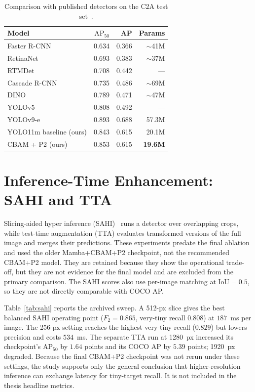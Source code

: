 \begin{table}[tbp]
  \centering
  \caption{Comparison with published detectors on the C2A test set~\cite{nihal2024c2a}.}
  \label{tab:sota}
  \begin{tabular}{@{}l r r r@{}}
    \toprule
    Model & $\mathrm{AP}_{50}$ & AP & Params \\
    \midrule
    Faster R-CNN            & 0.634 & 0.366 & $\sim$41M \\
    RetinaNet               & 0.693 & 0.383 & $\sim$37M \\
    RTMDet                  & 0.708 & 0.442 & --- \\
    Cascade R-CNN           & 0.735 & 0.486 & $\sim$69M \\
    DINO                    & 0.789 & 0.471 & $\sim$47M \\
    YOLOv5                  & 0.808 & 0.492 & --- \\
    YOLOv9-e                & 0.893 & 0.688 & 57.3M \\
    \midrule
    YOLO11m baseline (ours) & 0.843 & 0.615 & 20.1M \\
    CBAM + P2 (ours)        & 0.853 & 0.615 & \textbf{19.6M} \\
    \bottomrule
  \end{tabular}
\end{table}

\section{Inference-Time Enhancement: SAHI and TTA}
\label{sec:sahitta}
Slicing-aided hyper inference (SAHI)~\cite{akyon2022sahi} runs a detector over
overlapping crops, while test-time augmentation (TTA) evaluates transformed
versions of the full image and merges their predictions. These experiments
predate the final ablation and used the older Mamba+CBAM+P2 checkpoint, not the
recommended CBAM+P2 model. They are retained because they show the operational
trade-off, but they are not evidence for the final model and are excluded from
the primary comparison. The SAHI scores also use per-image matching at
$\mathrm{IoU}=0.5$, so they are not directly comparable with COCO AP.

Table~\ref{tab:sahi} reports the archived sweep. A 512-px slice gives the best
balanced SAHI operating point ($F_2=0.865$, very-tiny recall $0.808$) at
$187$~ms per image. The 256-px setting reaches the highest very-tiny recall
($0.829$) but lowers precision and costs $534$~ms. The separate TTA run at
1280~px increased its checkpoint's $\mathrm{AP}_{50}$ by $1.64$ points and
its COCO AP by $5.39$ points; 1920~px degraded. Because the final CBAM+P2
checkpoint was not rerun under these settings, the study supports only the
general conclusion that higher-resolution inference can exchange latency for
tiny-target recall. It is not included in the thesis headline metrics.

